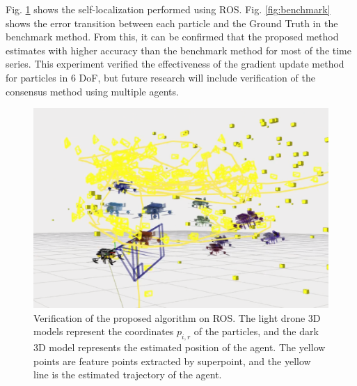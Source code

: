 \documentclass[a4paper,fleqn,10pt,twocolumn]{SICE_ISCS}
\begin{document}
Fig. \ref{fig:ros_demo} shows the self-localization performed using ROS.
Fig. \ref{fig:benchmark} shows the error transition between each particle and the Ground Truth in the benchmark method. From this, it can be confirmed that the proposed method estimates with higher accuracy than the benchmark method for most of the time series. This experiment verified the effectiveness of the gradient update method for particles in 6 DoF, but future research will include verification of the consensus method using multiple agents.

\begin{figure}[t]
	\begin{center}
		\includegraphics[width=\linewidth]{Fig/particle_filter_demo.eps}
		\caption{Verification of the proposed algorithm on ROS. The light drone 3D models represent the coordinates $p_{i,r}$ of the particles, and the dark 3D model represents the estimated position of the agent. The yellow points are feature points extracted by superpoint, and the yellow line is the estimated trajectory of the agent.}
		\label{fig:ros_demo}
	\end{center}
	\vspace{-2mm}
\end{figure}
\end{document}

